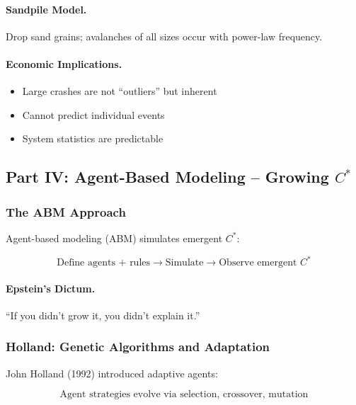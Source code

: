 \paragraph{Sandpile Model.}
Drop sand grains; avalanches of all sizes occur with power-law frequency.

\paragraph{Economic Implications.}
\begin{itemize}
    \item Large crashes are not ``outliers'' but inherent
    \item Cannot predict individual events
    \item System statistics are predictable
\end{itemize}

\subsection{Part IV: Agent-Based Modeling – Growing $C^*$}

\subsubsection{The ABM Approach}

Agent-based modeling (ABM) simulates emergent $C^*$:

\begin{equation}
\boxed{
\text{Define agents + rules} \to \text{Simulate} \to \text{Observe emergent } C^*
}
\label{eq:abm}
\end{equation}

\paragraph{Epstein's Dictum.}
``If you didn't grow it, you didn't explain it.''

\subsubsection{Holland: Genetic Algorithms and Adaptation}

John Holland (1992) introduced adaptive agents:

\begin{equation}
\text{Agent strategies evolve via selection, crossover, mutation}
\end{equation}

